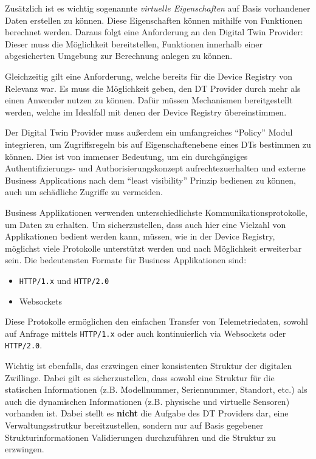 Zusätzlich ist es wichtig sogenannte \textit{virtuelle Eigenschaften} auf Basis vorhandener Daten erstellen zu können. Diese Eigenschaften können mithilfe von Funktionen berechnet werden. Daraus folgt eine Anforderung an den Digital Twin Provider: Dieser muss die Möglichkeit bereitstellen, Funktionen innerhalb einer abgesicherten Umgebung zur Berechnung anlegen zu können.

Gleichzeitig gilt eine Anforderung, welche bereits für die Device Registry von Relevanz war. Es muss die Möglichkeit geben, den \ac{DT} Provider durch mehr als einen Anwender nutzen zu können. Dafür müssen Mechanismen bereitgestellt werden, welche im Idealfall mit denen der Device Registry übereinstimmen.

Der Digital Twin Provider muss außerdem ein umfangreiches \enquote{Policy} Modul integrieren, um Zugriffsregeln bis auf Eigenschaftenebene eines \ac{DT}s bestimmen zu können. Dies ist von immenser Bedeutung, um ein durchgängiges Authentifizierungs- und Authorisierungskonzept aufrechtezuerhalten und externe Business Applications nach dem \enquote{least visibility} Prinzip bedienen zu können, auch um schädliche Zugriffe zu vermeiden.

Business Applikationen verwenden unterschiedlichste Kommunikationsprotokolle, um Daten zu erhalten. Um sicherzustellen, dass auch hier eine Vielzahl von Applikationen bedient werden kann, müssen, wie in der Device Registry, möglichst viele Protokolle unterstützt werden und nach Möglichkeit erweiterbar sein. Die bedeutensten Formate für Business Applikationen sind:

\begin{itemize}
    \item \texttt{HTTP/1.x} und \texttt{HTTP/2.0}
    \item Websockets
\end{itemize}

Diese Protokolle ermöglichen den einfachen Transfer von Telemetriedaten, sowohl auf Anfrage mittels \texttt{HTTP/1.x} oder auch kontinuierlich via Websockets oder \texttt{HTTP/2.0}.

Wichtig ist ebenfalls, das erzwingen einer konsistenten Struktur der digitalen Zwillinge. Dabei gilt es sicherzustellen, dass sowohl eine Struktur für die statischen Informationen (z.B. Modellnummer, Seriennummer, Standort, etc.) als auch die dynamischen Informationen (z.B. physische und virtuelle Sensoren) vorhanden ist. Dabei stellt es \textbf{nicht} die Aufgabe des \ac{DT} Providers dar, eine Verwaltungsstrutkur bereitzustellen, sondern nur auf Basis gegebener Strukturinformationen Validierungen durchzuführen und die Struktur zu erzwingen.

